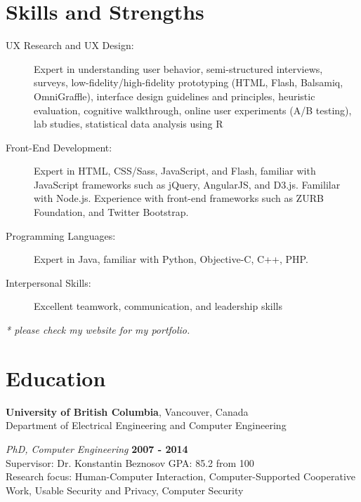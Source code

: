 \documentclass[margin]{res}
\begin{document}
\address{2106 668 Citadel Parade \\ Vancouver, BC V6B 1W6 \\ (778) 322-0513}
\address{http://pooya.jaferian.com\\ pooya@ece.ubc.ca \\}

\begin{resume}

\section{\sc Skills and Strengths}
\begin{description}
  \item[UX Research and UX Design:] Expert in understanding user behavior, semi-structured interviews, surveys, low-fidelity/high-fidelity prototyping (HTML, Flash, Balsamiq, OmniGraffle), interface design guidelines and principles, heuristic evaluation, cognitive walkthrough, online user experiments (A/B testing), lab studies, statistical data analysis using R
  \item[Front-End Development:] Expert in HTML, CSS/Sass, JavaScript, and Flash, familiar with JavaScript frameworks such as jQuery, AngularJS, and D3.js. Famililar with Node.js. Experience with front-end frameworks such as ZURB Foundation, and Twitter Bootstrap.
  \item[Programming Languages:] Expert in Java, familiar with Python, Objective-C, C++, PHP.
  \item[Interpersonal Skills:] Excellent teamwork, communication, and leadership skills
\end{description}
\emph{* please check my website for my portfolio.}

\hrulefill

\section{\sc Education}
{\bf University of British Columbia}, Vancouver, Canada\\
Department of Electrical Engineering and Computer Engineering

\vspace{-.3cm}
{\em PhD, Computer Engineering} \hfill {\bf 2007 - 2014}\\
Supervisor: Dr. Konstantin Beznosov \hfill GPA: 85.2 from 100 \\
Research focus: Human-Computer Interaction, Computer-Supported Cooperative Work, Usable Security and Privacy, Computer Security


\end{resume}
\end{document}

